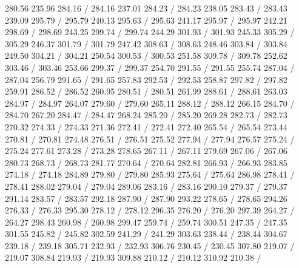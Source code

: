 { 280.56 235.96 284.16 /
 284.16 237.01 284.23 /
 284.23 238.05 283.43 /
 283.43 239.09 295.79 /
 295.79 240.13 295.63 /
 295.63 241.17 295.97 /
 295.97 242.21 298.69 /
 298.69 243.25 299.74 /
 299.74 244.29 301.93 /
 301.93 245.33 305.29 /
 305.29 246.37 301.79 /
 301.79 247.42 308.63 /
 308.63 248.46 303.84 /
 303.84 249.50 304.21 /
 304.21 250.54 300.53 /
 300.53 251.58 309.78 /
 309.78 252.62 303.46 /
 303.46 253.66 299.37 /
 299.37 254.70 291.55 /
 291.55 255.74 287.04 /
 287.04 256.79 291.65 /
 291.65 257.83 292.53 /
 292.53 258.87 297.82 /
 297.82 259.91 286.52 /
 286.52 260.95 280.51 /
 280.51 261.99 288.61 /
 288.61 263.03 284.97 /
 284.97 264.07 279.60 /
 279.60 265.11 288.12 /
 288.12 266.15 284.70 /
 284.70 267.20 284.47 /
 284.47 268.24 285.20 /
 285.20 269.28 282.73 /
 282.73 270.32 274.33 /
 274.33 271.36 272.41 /
 272.41 272.40 265.54 /
 265.54 273.44 270.81 /
 270.81 274.48 276.51 /
 276.51 275.52 277.94 /
 277.94 276.57 275.24 /
 275.24 277.61 273.28 /
 273.28 278.65 267.11 /
 267.11 279.69 267.06 /
 267.06 280.73 268.73 /
 268.73 281.77 270.64 /
 270.64 282.81 266.93 /
 266.93 283.85 274.18 /
 274.18 284.89 279.80 /
 279.80 285.93 275.64 /
 275.64 286.98 278.41 /
 278.41 288.02 279.04 /
 279.04 289.06 283.16 /
 283.16 290.10 279.37 /
 279.37 291.14 283.57 /
 283.57 292.18 287.90 /
 287.90 293.22 278.65 /
 278.65 294.26 276.33 /
 276.33 295.30 278.12 /
 278.12 296.35 276.20 /
 276.20 297.39 264.27 /
 264.27 298.43 260.98 /
 260.98 299.47 259.74 /
 259.74 300.51 247.35 /
 247.35 301.55 245.82 /
 245.82 302.59 241.29 /
 241.29 303.63 238.44 /
 238.44 304.67 239.18 /
 239.18 305.71 232.93 /
 232.93 306.76 230.45 /
 230.45 307.80 219.07 /
 219.07 308.84 219.93 /
 219.93 309.88 210.12 /
 210.12 310.92 210.38 /
}
